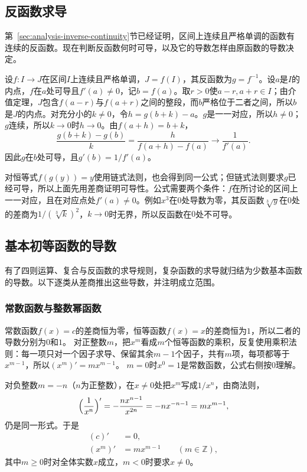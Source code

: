 \subsection{反函数求导}
第~\ref{sec:analysis-inverse-continuity}节已经证明，区间上连续且严格单调的函数有连续的反函数。现在判断反函数何时可导，以及它的导数怎样由原函数的导数决定。

设$f:I\to J$在区间$I$上连续且严格单调，$J=f(I)$，其反函数为$g=f^{-1}$。设$a$是$I$的内点，$f$在$a$处可导且$f'(a)\neq0$，记$b=f(a)$。取$r>0$使$a-r,a+r\in I$；由介值定理，$J$包含$f(a-r)$与$f(a+r)$之间的整段，而$b$严格位于二者之间，所以$b$是$J$的内点。对充分小的$k\neq0$，令$h=g(b+k)-a$。$g$是一一对应，所以$h\neq0$；$g$连续，所以$k\to0$时$h\to0$。由$f(a+h)=b+k$，
\[
 \frac{g(b+k)-g(b)}k
 =\frac{h}{f(a+h)-f(a)}\longrightarrow\frac1{f'(a)}.
\]
因此$g$在$b$处可导，且$g'(b)=1/f'(a)$。

对恒等式$f(g(y))=y$使用链式法则，也会得到同一公式；但链式法则要求$g$已经可导，所以上面先用差商证明可导性。公式需要两个条件：$f$在所讨论的区间上一一对应，且在对应点处$f'(a)\neq0$。例如$x^3$在$0$处导数为零，其反函数$\sqrt[3]y$在$0$处的差商为$1/(\sqrt[3]k)^2$，$k\to0$时无界，所以反函数在$0$处不可导。

\subsection{基本初等函数的导数}
\label{sec:analysis-elementary-derivatives}

有了四则运算、复合与反函数的求导规则，复杂函数的求导就归结为少数基本函数的导数。以下逐类从差商推出这些导数，并注明成立范围。

\subsubsection{常数函数与整数幂函数}
常数函数$f(x)=c$的差商恒为零，恒等函数$f(x)=x$的差商恒为$1$，所以二者的导数分别为$0$和$1$。
对正整数$m$，把$x^m$看成$m$个恒等函数的乘积，反复使用乘积法则：每一项只对一个因子求导、保留其余$m-1$个因子，共有$m$项，每项都等于$x^{m-1}$，所以$(x^m)'=mx^{m-1}$。
$m=0$时$x^0=1$是常数函数，公式右侧按$0$理解。

对负整数$m=-n$（$n$为正整数），在$x\neq0$处把$x^m$写成$1/x^n$，由商法则，
\[
 \Bigl(\frac1{x^n}\Bigr)'=-\frac{nx^{n-1}}{x^{2n}}=-nx^{-n-1}=mx^{m-1},
\]
仍是同一形式。于是
\[
 \begin{aligned}
 (c)'&=0,\\
 (x^m)'&=mx^{m-1}\qquad(m\in\mathbb Z),
 \end{aligned}
\]
其中$m\geq0$时对全体实数$x$成立，$m<0$时要求$x\neq0$。


